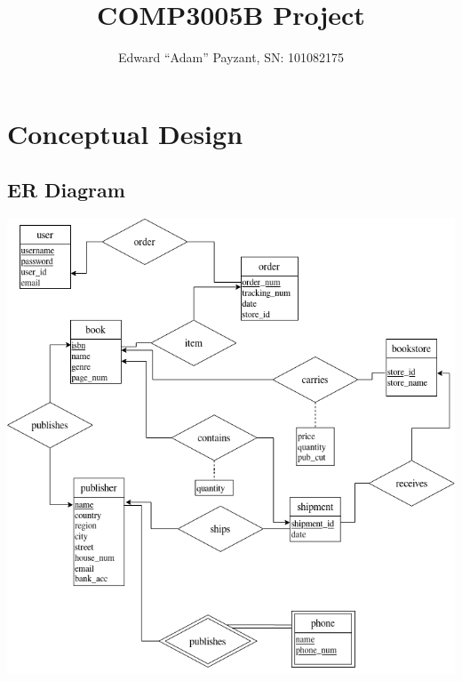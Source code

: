\documentclass[titlepage, oneside]{article}
\author{Edward ``Adam'' Payzant, SN: 101082175}
\title{COMP3005B Project}
\begin{document}
    \maketitle
    \section{Conceptual Design}
        \subsection{ER Diagram}
            \begin{center}
                \includegraphics[scale=.65]{images/ERDiagram.png}
            \end{center}
\end{document}
